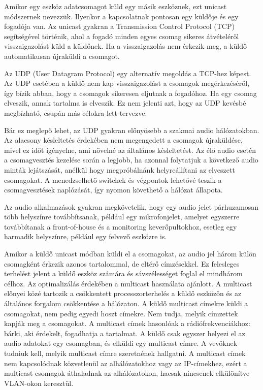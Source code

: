 Amikor egy eszköz adatcsomagot küld egy másik eszköznek, ezt unicast módszernek nevezzük. 
Ilyenkor a kapcsolatnak pontosan egy küldője és egy fogadója van. 
Az unicast gyakran a Transmission Control Protocol (TCP) segítségével történik, ahol a 
fogadó minden egyes csomag sikeres átvételéről visszaigazolást küld a küldőnek. 
Ha a visszaigazolás nem érkezik meg, a küldő automatikusan újraküldi a csomagot.

Az UDP (User Datagram Protocol) egy alternatív megoldás a TCP-hez képest. 
Az UDP esetében a küldő nem kap visszaigazolást a csomagok megérkezéséről, így bízik abban, hogy 
a csomagok sikeresen eljutnak a fogadóhoz. Ha egy csomag elveszik, annak tartalma is elveszik. 
Ez nem jelenti azt, hogy az UDP kevésbé megbízható, csupán más célokra lett tervezve.

Bár ez meglepő lehet, az UDP gyakran előnyösebb a szakmai audio hálózatokban. 
Az alacsony késleltetés érdekében nem megengedett a csomagok újraküldése, mivel ez időt igényelne, 
ami növelné az általános késleltetést. Az élő audio esetén a csomagvesztés kezelése során a legjobb, 
ha azonnal folytatjuk a következő audio minták lejátszását, anélkül hogy megpróbálnánk helyreállítani 
az elveszett csomagokat. A menedzselhető switchek és végpontok lehetővé teszik a 
csomagvesztések naplózását, így nyomon követhető a hálózat állapota.

Az audio alkalmazások gyakran megkövetelik, hogy egy audio jelet párhuzamosan 
több helyszínre továbbítsanak, például egy mikrofonjelet, amelyet egyszerre továbbítanak a 
front-of-house és a monitoring keverőpultokhoz, esetleg egy harmadik helyszínre, például egy felvevő eszközre is.

Amikor a küldő unicast módban küldi el a csomagokat, az audio jel három külön 
csomagként érkezik azonos tartalommal, de eltérő címzésekkel. Ez felesleges terhelést jelent 
a küldő eszköz számára és sávszélességet foglal el mindhárom célhoz. Az optimalizálás érdekében 
a multicast használata ajánlott. A multicast előnyei közé tartozik a csökkentett processzorterhelés 
a küldő eszközön és az általános forgalom csökkentése a hálózaton. A küldő multicast címekre küldi 
a csomagokat, nem pedig egyedi hoszt címekre. Nem tudja, melyik címzettek kapják meg a csomagokat. 
A multicast címek hasonlóak a rádiófrekvenciákhoz: bárki, aki érdekelt, fogadhatja a tartalmat. 
A küldő csak egyszer helyezi el az audio adatokat egy csomagban, és elküldi egy multicast címre. 
A vevőknek tudniuk kell, melyik multicast címre szeretnének hallgatni. 
A multicast címek nem kapcsolódnak közvetlenül az alhálózatokhoz vagy az IP-címekhez, ezért a 
multicast csomagok áthaladnak az alhálózatokon, hacsak nincsenek elkülönítve VLAN-okon keresztül.

